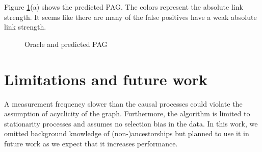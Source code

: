 \documentclass[conference]{IEEEtran}
\begin{document}
Figure \ref{fig:predicted}(a) shows the predicted PAG. The colors represent the absolute link strength. It seems like there are many of the false positives have a weak absolute link strength.
\begin{figure}[htbp]
    \centering
    \caption{Oracle and predicted PAG}
        \label{fig:predicted}
\end{figure}


% 


\section{Limitations and future work}
A measurement frequency slower than the causal processes could violate the assumption of acyclicity of the graph. 
Furthermore, the algorithm is limited to stationarity processes and assumes no selection bias in the data.
In this work, we omitted background knowledge of (non-)ancestorships but planned to use it in future work as we expect that it increases performance.
\end{document}
